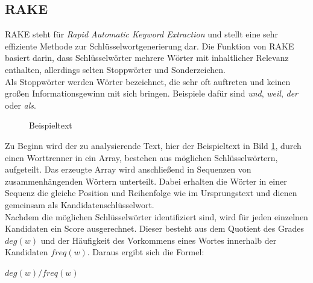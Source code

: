 	\subsection{RAKE}
	\label{sec:RAKE}
	RAKE steht für \textit{Rapid Automatic Keyword Extraction} und stellt eine sehr effiziente Methode zur Schlüsselwortgenerierung dar. Die Funktion von RAKE basiert darin, dass Schlüsselwörter mehrere Wörter mit inhaltlicher Relevanz enthalten, allerdings selten Stoppwörter und Sonderzeichen.\cite{rose2010automatic}\\
	Als Stoppwörter werden Wörter bezeichnet, die sehr oft auftreten und keinen großen Informationsgewinn mit sich bringen. Beispiele dafür sind \textit{und}, \textit{weil}, \textit{der} oder \textit{als}.\cite{Stopwords}\\
	
	\begin{figure}[h!]
		\caption{Beispieltext}
		\label{fig:text}
	\end{figure}
	
	Zu Beginn wird der zu analysierende Text, hier der Beispieltext in  Bild \ref{fig:text}, durch einen Worttrenner in ein Array, bestehen aus möglichen Schlüsselwörtern, aufgeteilt. Das erzeugte Array wird anschließend in Sequenzen von zusammenhängenden Wörtern unterteilt. Dabei erhalten die Wörter in einer Sequenz die gleiche Position und Reihenfolge wie im Ursprungstext und dienen gemeinsam als Kandidatenschlüsselwort.\cite{rose2010automatic}\\		
	Nachdem die möglichen Schlüsselwörter identifiziert sind, wird für jeden einzelnen Kandidaten ein Score ausgerechnet. Dieser besteht aus dem Quotient des Grades $deg(w)$ und der Häufigkeit des Vorkommens eines Wortes innerhalb der Kandidaten $freq(w)$. Daraus ergibt sich die Formel:
	\begin{center}
		$deg(w)/freq(w) $
	\end{center}	
	
